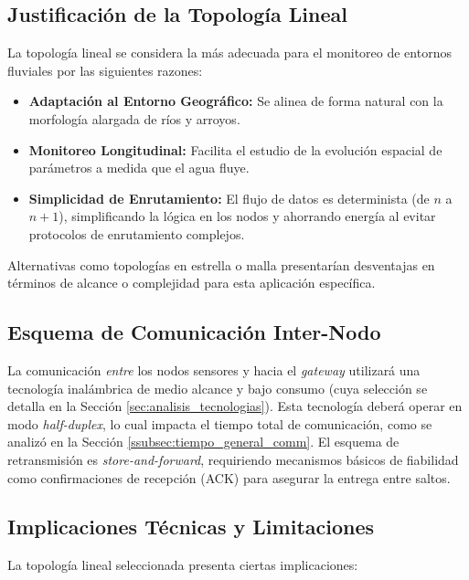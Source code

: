 \subsection{Justificación de la Topología Lineal}
\label{subsec:justificacion_topologia}

La topología lineal se considera la más adecuada para el monitoreo de entornos fluviales por las siguientes razones:

\begin{itemize}
    \item \textbf{Adaptación al Entorno Geográfico:} Se alinea de forma natural con la morfología alargada de ríos y arroyos.
    \item \textbf{Monitoreo Longitudinal:} Facilita el estudio de la evolución espacial de parámetros a medida que el agua fluye.
    \item \textbf{Simplicidad de Enrutamiento:} El flujo de datos es determinista (de $n$ a $n+1$), simplificando la lógica en los nodos y ahorrando energía al evitar protocolos de enrutamiento complejos. 
\end{itemize}
Alternativas como topologías en estrella o malla presentarían desventajas en términos de alcance o complejidad para esta aplicación específica.

\subsection{Esquema de Comunicación Inter-Nodo}
\label{subsec:esquema_comunicacion_inter_nodo} 

La comunicación \textit{entre} los nodos sensores y hacia el \textit{gateway} utilizará una tecnología inalámbrica de medio alcance y bajo consumo (cuya selección se detalla en la Sección \ref{sec:analisis_tecnologias}). Esta tecnología deberá operar en modo \textit{half-duplex}, lo cual impacta el tiempo total de comunicación, como se analizó en la Sección \ref{ssubsec:tiempo_general_comm}. El esquema de retransmisión es \textit{store-and-forward}, requiriendo mecanismos básicos de fiabilidad como confirmaciones de recepción (ACK) para asegurar la entrega entre saltos.

\subsection{Implicaciones Técnicas y Limitaciones}
\label{subsec:implicaciones_topologia}

La topología lineal seleccionada presenta ciertas implicaciones:

